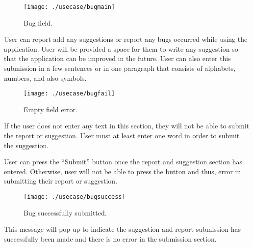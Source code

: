 \documentclass[conference]{IEEEtran}
\begin{document}
\begin{figure}[h!]
\texttt{[image: ./usecase/bugmain]}
\centering
\caption{Bug field.}
\end{figure}

User can report add any suggestions or report any bugs occurred while using the application. User will be provided a space for them to write any suggestion so that the application can be improved in the future. User can also enter this submission in a few sentences or in one paragraph that consists of alphabets, numbers, and also symbols. 
\begin{figure}[h!]
\texttt{[image: ./usecase/bugfail]}
\centering
\caption{Empty field error.}
\end{figure}
If the user does not enter any text in this section, they will not be able to submit the report or suggestion. User must at least enter one word in order to submit the suggestion.

User can press the “Submit” button once the report and suggestion section has entered. Otherwise, user will not be able to press the button and thus, error in submitting their report or suggestion.

\begin{figure}[h!]
\texttt{[image: ./usecase/bugsuccess]}
\centering
\caption{Bug successfully submitted.}
\end{figure}

This message will pop-up to indicate the suggestion and report submission has successfully been made and there is no error in the submission section. 
\end{document}

